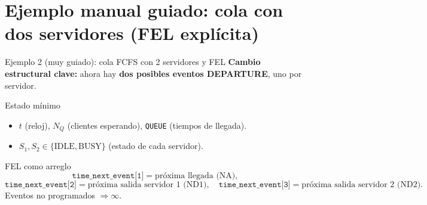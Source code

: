 \documentclass[aspectratio=1610, 9pt]{beamer}
\begin{document}
\section{Ejemplo manual guiado: cola con dos servidores (FEL explícita)}

\begin{frame}{Ejemplo 2 (muy guiado): cola FCFS con 2 servidores y FEL}
\small
\textbf{Cambio estructural clave:} ahora hay \textbf{dos posibles eventos DEPARTURE}, uno por servidor.

\vspace{4pt}
\begin{block}{Estado mínimo}
\begin{itemize}
\item $t$ (reloj), $N_Q$ (clientes esperando), \texttt{QUEUE} (tiempos de llegada).
\item $S_1,S_2\in\{\text{IDLE},\text{BUSY}\}$ (estado de cada servidor).
\end{itemize}
\end{block}

\vspace{4pt}
\begin{block}{FEL como arreglo }
\[
\texttt{time\_next\_event[1]}=\text{próxima llegada (NA)},
\]
\[
\texttt{time\_next\_event[2]}=\text{próxima salida servidor 1 (ND1)},\quad
\texttt{time\_next\_event[3]}=\text{próxima salida servidor 2 (ND2)}.
\]
Eventos no programados $\Rightarrow \infty$.
\end{block}
\end{frame}
\end{document}
